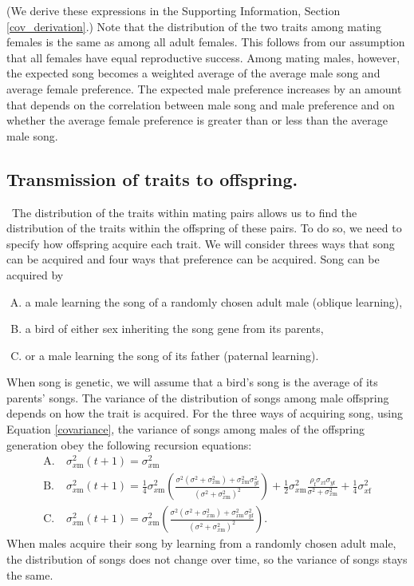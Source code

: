\documentclass[12pt]{article}
\newcommand{\x}[1]{\text{#1}}
\begin{document}
(We derive these expressions in the Supporting Information, Section \ref{cov_derivation}.) Note that the distribution of the two traits among mating females is the same as among all adult females. This follows from our assumption that all females have equal reproductive success. Among mating males, however, the expected song becomes a weighted average of the average male song and average female preference. The expected male preference increases by an amount that depends on the correlation between male song and male preference and on whether the average female preference is greater than or less than the average male song.

\subsection*{Transmission of traits to offspring.  } 
\ The distribution of the traits within mating pairs allows us to find the distribution of the traits within the offspring of these pairs. To do so, we need to specify how offspring acquire each trait. We will consider threes ways that song can be acquired and four ways that preference can be acquired. Song can be acquired by 
\begin{enumerate}[A.]
\item a male learning the song of a randomly chosen adult male (oblique learning),
\item a bird of either sex inheriting the song gene from its parents, 
\item or a male learning the song of its father (paternal learning).
\end{enumerate}
When song is genetic, we will assume that a bird's song is the average of its parents' songs. 
The variance of the distribution of songs among male offspring depends on how the trait is acquired. For the three ways of acquiring song, using Equation \ref{covariance}, the variance of songs among males of the offspring generation obey the following recursion equations: 
\begin{align*}
\x{A.} \ &\sigma_{x\x{m}}^2(t+1)=\sigma_{x\x{m}}^2
\\ \x{B.} \ &\sigma_{x\x{m}}^2(t+1)=\frac{1}{4}\sigma_{x\x{m}}^2\left(\frac{\sigma^2(\sigma^2+\sigma_{x\x{m}}^2)+\sigma_{ x\x{m}}^2\sigma_{y\x{f}}^2}{(\sigma^2+\sigma_{x\x{m}}^2)^2}\right)+\frac{1}{2}\sigma_{x\x{m}}^2\frac{\rho_\x{f}\sigma_{x\x{f}}\sigma_{y\x{f}}}{\sigma^2+\sigma_{x\x{m}}^2}+\frac{1}{4}\sigma_{x\x{f}}^2
\\\x{C.} \ &\sigma_{x\x{m}}^2(t+1)=\sigma_{x\x{m}}^2\left(\frac{\sigma^2(\sigma^2+\sigma_{x\x{m}}^2)+\sigma_{ x\x{m}}^2\sigma_{y\x{f}}^2}{(\sigma^2+\sigma_{x\x{m}}^2)^2}\right).
\end{align*}
When males acquire their song by learning from a randomly chosen adult male, the distribution of songs does not change over time, so the variance of songs stays the same. 
\end{document}
